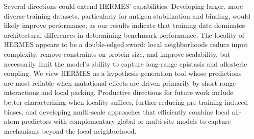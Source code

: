 Several directions could extend HERMES' capabilities. Developing larger, more diverse training
datasets, particularly for antigen stabilization and binding, would likely improve performance, as
our results indicate that training data dominates architectural differences in determining benchmark
performance. The locality of HERMES appears to be a double-edged sword: local neighborhoods reduce
input complexity, remove constraints on protein size, and improve scalability, but necessarily limit
the model's ability to capture long-range epistasis and allosteric coupling. We view HERMES as a
hypothesis-generation tool whose predictions are most reliable when mutational effects are driven
primarily by short-range interactions and local packing. Productive directions for future work
include better characterizing when locality suffices, further reducing pre-training-induced biases,
and developing multi-scale approaches that efficiently combine local all-atom predictors with
complementary global or multi-site models to capture mechanisms beyond the local neighborhood.

